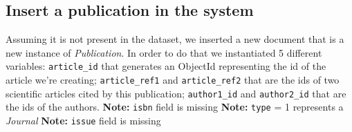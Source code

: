 \documentclass{Configuration_Files/PoliMi3i_thesis}
\begin{document}
\subsection{Insert a publication in the system}
\label{pub_insert}
Assuming it is not present in the dataset, we inserted a new document that is a new instance of \emph{Publication}.
In order to do that we instantiated 5 different variables: \verb |article_id| that generates an ObjectId representing
the id of the article we're creating; \verb |article_ref1| and \verb |article_ref2| that are the ids of two scientific
articles cited by this publication; \verb |author1_id| and \verb |author2_id| that are the ids of the authors.\newline
\textbf{Note:} \verb |isbn| field is missing \newline
\textbf{Note:} \verb |type| = 1 represents a \emph{Journal} \newline
\textbf{Note:} \verb |issue| field is missing
\end{document}
